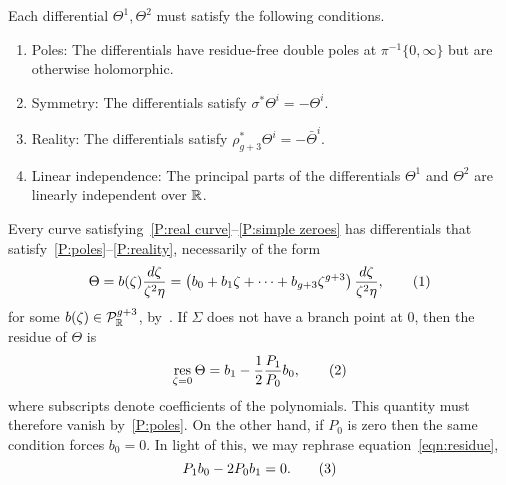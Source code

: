 \documentclass{article}
\begin{document}
Each differential $\Theta^1,\Theta^2$ must satisfy the following conditions.
\begin{enumerate}[resume*]
\item\label{P:poles} Poles: The differentials have residue-free double poles at $\pi^{-1}\{0,\infty\}$ but are otherwise holomorphic.
\item\label{P:symmetry} Symmetry: The differentials satisfy $\sigma^* \Theta^i = - \Theta^i$.
\item\label{P:reality} Reality: The differentials satisfy $\rho_{g+3}^* \Theta^i = - \bar{\Theta}^i$.
\item\label{P:linear independence} Linear independence: The principal parts of the differentials $\Theta^1$ and $\Theta^2$ are linearly independent over $\mathbb{R}$.
\end{enumerate}

Every curve satisfying~\ref{P:real curve}--\ref{P:simple zeroes} has differentials that satisfy~\ref{P:poles}--\ref{P:reality}, necessarily of the form
\[
\Theta = b(\zeta)\frac{d\zeta}{\zeta^2\eta} = \left( b_0 + b_1 \zeta + \cdots + b_{g+3} \zeta^{g+3} \right) \frac{d\zeta}{\zeta^2\eta},
\labelthis{eqn:def b}
\]
for some $b(\zeta) \in \mathcal{P}^{g+3}_{\mathbb{R}}$, by~\cite[Prop~III.1.10]{Miranda1995}. If $\Sigma$ does not have a branch point at $0$, then the residue of $\Theta$ is
\[
\operatorname*{res}_{\zeta=0}\Theta = b_1 - \frac{1}{2}\frac{P_1}{P_0}b_0,
\labelthis{eqn:residue}
\]
where subscripts denote coefficients of the polynomials. This quantity must therefore vanish by~\ref{P:poles}. On the other hand, if $P_0$ is zero then the same condition forces $b_0=0$. In light of this, we may rephrase equation~\eqref{eqn:residue},
\[
P_1b_0 - 2P_0b_1 = 0.
\labelthis{eqn:residue condition}
\]
\end{document}
